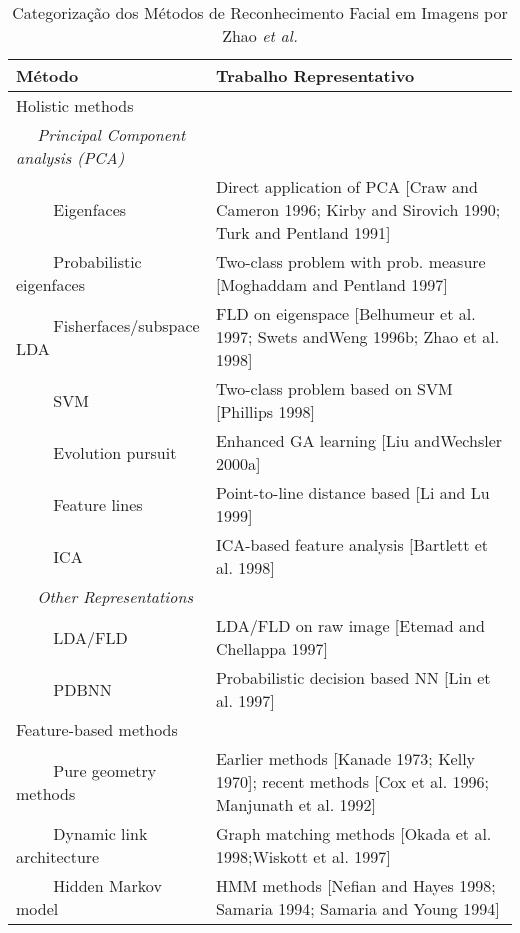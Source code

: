 \begin{center}
\begin{table}
	\caption{Categorização dos Métodos de Reconhecimento Facial em Imagens por Zhao \textit{et al.} \citep{Zhao2003}}
	\centering
	\begin{tabular}{l p{8cm}}
	\hline\hline
        Método                     & Trabalho Representativo\\
	\hline
Holistic methods	 \\	
$\quad$ \textit{Principal Component analysis (PCA)} \\
$\qquad$  Eigenfaces                 & Direct application of PCA [Craw and Cameron 1996; Kirby and Sirovich 1990; Turk and Pentland 1991] \\
$\qquad$        Probabilistic eigenfaces   & Two-class problem with prob. measure [Moghaddam and Pentland 1997] \\
$\qquad$        Fisherfaces/subspace LDA   & FLD on eigenspace [Belhumeur et al. 1997; Swets andWeng 1996b; Zhao et al. 1998] \\ 
$\qquad$        SVM                        & Two-class problem based on SVM [Phillips 1998] \\ 
$\qquad$        Evolution pursuit          & Enhanced GA learning [Liu andWechsler 2000a] \\ 
$\qquad$        Feature lines              & Point-to-line distance based [Li and Lu 1999] \\ 
$\qquad$        ICA                        & ICA-based feature analysis [Bartlett et al. 1998] \\ 
$\quad$ \textit{Other Representations} \\
$\qquad$        LDA/FLD                    & LDA/FLD on raw image [Etemad and Chellappa 1997] \\ 
$\qquad$        PDBNN                      & Probabilistic decision based NN [Lin et al. 1997] \\

Feature-based methods \\
$\qquad$        Pure geometry methods      & Earlier methods [Kanade 1973; Kelly 1970]; recent methods [Cox et al. 1996; Manjunath et al. 1992] \\ 
$\qquad$        Dynamic link architecture  & Graph matching methods [Okada et al. 1998;Wiskott et al. 1997] \\ 
$\qquad$        Hidden Markov model        & HMM methods [Nefian and Hayes 1998; Samaria 1994; Samaria and Young 1994] \\


\end{tabular}
\end{table}
\end{center}
